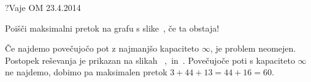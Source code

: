 \begin{naloga}{?}{Vaje OM 23.4.2014}
\begin{vprasanje}
Poišči maksimalni pretok na grafu s slike~\fig, če ta obstaja!

\begin{slika}
\pgfslika
{}
\end{slika}
\end{vprasanje}

\begin{odgovor}
Če najdemo povečujočo pot z najmanjšo kapaciteto $\infty$,
je problem neomejen.
Postopek reševanja je prikazan na slikah~%
,~ in~.
Povečujoče poti s kapaciteto $\infty$ ne najdemo,
dobimo pa maksimalen pretok $3+44+13 = 44+16 = 60$.

\begin{slika}
\end{slika}
\begin{slika}
\end{slika}
\begin{slika}
\end{slika}
\end{odgovor}
\end{naloga}
